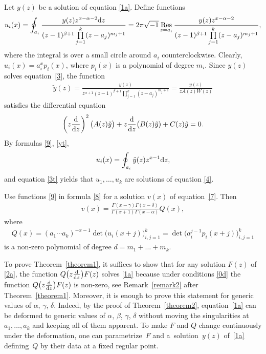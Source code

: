 \documentclass[pdftex]{sigma}
\numberwithin{equation}{section}
\def\lc{,\allowbreak\ldots,\allowbreak}
\def\Res{\mathop{\mathrm{Res}}\limits}
\def\yt{\tilde y}
\begin{document}
Let $y(z)$ be a solution of equation \eqref{1a}. Define functions
\begin{gather}
 u_i(x) = \oint_{a_i}\frac{y(z) z^{x-\alpha-2} {\rm d}z}
{(z-1)^{\beta+1}\prod\limits_{j=1}^k(z-a_j)^{m_j+1}}
= 2\pi\sqrt{-1} \Res_{z=a_i} \frac{y(z) z^{x-\alpha-2}}
{(z-1)^{\beta+1}\prod\limits_{j=1}^k(z-a_j)^{m_j+1}},\label{9}
\end{gather}
where the integral is over a small circle around $a_i$ counterclockwise. Clearly, $u_i(x)=a_i^xp_i(x)$, where $p_i(x)$ is a polynomial of degree $m_i$. Since $y(z)$ solves equation~\eqref{3}, the function
\begin{gather}\label{yt}
\yt(z) =
\frac{y(z)}{z^{\alpha+1}(z-1)^{\beta+1}\prod\limits_{j=1}^k(z-a_j)^{m_j+1}} =\frac{y(z)}{zA(z)W(z)}
\end{gather}
satisfies the differential equation
\begin{gather}
\left(z\frac{{\rm d}}{{\rm d}z}\right)^{ 2} \bigl( A(z) \yt\bigr)+ z\frac{{\rm d}}{{\rm d}z}\bigl(B(z) \yt)+C(z) \yt = 0.\label{3t}
\end{gather}
By formulas \eqref{9}, \eqref{yt},{\samepage
\begin{gather*}%
u_i(x)=\oint_{a_i}\yt(z) z^{x-1} {\rm d}z,
\end{gather*}
and equation \eqref{3t} yields that $u_1\lc u_k$ are solutions of equation \eqref{4}.}

Use functions \eqref{9} in formula \eqref{8} for a solution $v(x)$ of equation~\eqref{7}. Then
\begin{gather}
v(x) = \frac{\Gamma(x-\gamma) \Gamma(x-\delta)}{\Gamma(x+1) \Gamma(x-\alpha)} Q(x),\label{10}
\end{gather}
where
\begin{gather*}%
Q(x) = (a_1\cdots a_k)^{-x-1}\det\bigl(u_i(x+j)\bigr)_{i,j=1}^k=
 \det\bigl(a_i^{j-1}p_i(x+j)\bigr)_{i,j=1}^k
\end{gather*}
is a non-zero polynomial of degree $d=m_1+\dots+m_k$.

To prove Theorem~\ref{theorem1}, it suffices to show that for any solution $F(z)$ of \eqref{2a}, the function $Q\big(z\frac{{\rm d}}{{\rm d}z}\big)F(z)$ solves \eqref{1a} because under conditions \eqref{0d} the function $Q\big(z\frac{{\rm d}}{{\rm d}z}\big)F(z)$ is non-zero, see Remark~\ref{remark2} after Theorem~\ref{theorem1}. Moreover, it is enough to prove this statement for generic values of $\alpha$, $\gamma$, $\delta$. Indeed, by the proof of Theorem~\ref{theorem2}, equation~\eqref{1a} can be deformed to generic values of $\alpha$, $\beta$, $\gamma$, $\delta$ without moving the singularities at $a_1\lc a_k$ and keeping all of them apparent. To make $F$ and $Q$ change continuously under the deformation, one can parametrize~$F$ and a~solution~$y(z)$ of~\eqref{1a} defining~$Q$ by their data at a fixed regular point.
\end{document}
